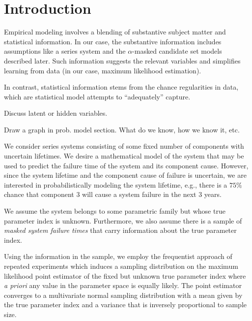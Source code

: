 \documentclass[../main.tex]{subfiles}
\begin{document}
\chapter{Introduction}
\label{sec:intro}
Empirical modeling involves a blending of substantive subject matter and statistical information.
In our case, the substantive information includes assumptions like a series system and the $\alpha$-masked candidate set models described later.
Such information suggests the relevant variables and simplifies learning from data (in our case, maximum likelihood estimation).

In contrast, statistical information stems from the chance regularities in data, which are statistical model attempts to ``adequately'' capture.


Discuss latent or hidden variables.

Draw a graph in prob. model section. What do we know, how we know it, etc.


We consider series systems consisting of some fixed number of components with 
uncertain lifetimes. We desire a mathematical model of the system that may be 
used to predict the failure time of the system and its component cause. 
However, since the system lifetime and the component cause of failure is 
uncertain, we are interested in probabilistically modeling the system lifetime, 
e.g., there is a $75\%$ chance that component $3$ will cause a system failure 
in the next $3$ years.

We assume the system belongs to some parametric family but whose true parameter 
index is unknown. Furthermore, we also assume there is a sample of 
\emph{masked system failure times} that carry information about the true 
parameter index.

Using the information in the sample, we employ the frequentist approach of 
repeated experiments which induces a sampling distribution on the maximum 
likelihood point estimator of the fixed but unknown true parameter index where 
\emph{a priori} any value in the parameter space is equally likely. The point 
estimator converges to a multivariate normal sampling distribution with a mean 
given by the true parameter index and a variance that is inversely proportional 
to sample size.
\end{document}
